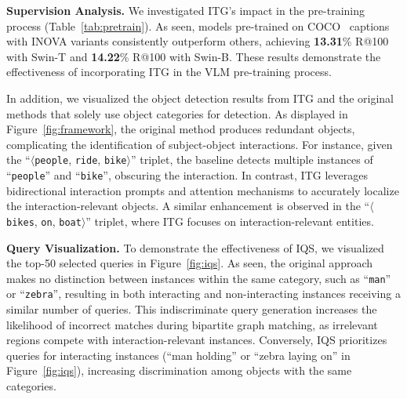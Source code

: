 \textbf{Supervision Analysis.}
We investigated ITG's impact in the pre-training process (\cf Table~\ref{tab:pretrain}). As seen, models pre-trained on COCO~\cite{chen2015microsoft} captions with INOVA variants consistently outperform others, achieving \textbf{13.31}\% R@100 with Swin-T and \textbf{14.22}\% R@100 with Swin-B. These results demonstrate the effectiveness of incorporating ITG in the VLM pre-training process.

In addition, we visualized the object detection results from ITG and the original methods that solely use object categories for detection. As displayed in Figure~\ref{fig:framework}, the original method produces redundant objects, complicating the identification of subject-object interactions. For instance, given the ``$\langle$\texttt{people}, \texttt{ride}, \texttt{bike}$\rangle$'' triplet, the baseline detects multiple instances of ``\texttt{people}'' and ``\texttt{bike}'', obscuring the interaction. In contrast, ITG leverages bidirectional interaction prompts and attention mechanisms to accurately localize the interaction-relevant objects. A similar enhancement is observed in the ``$\langle$\texttt{bikes}, \texttt{on}, \texttt{boat}$\rangle$'' triplet, where ITG focuses on interaction-relevant entities. 

\textbf{Query Visualization.} To demonstrate the effectiveness of IQS, we visualized the top-50 selected queries in Figure~\ref{fig:iqs}. As seen, the original approach makes no distinction between instances within the same category, such as ``\texttt{man}'' or ``\texttt{zebra}'', resulting in both interacting and non-interacting instances receiving a similar number of queries. This indiscriminate query generation increases the likelihood of incorrect matches during bipartite graph matching, as irrelevant regions compete with interaction-relevant instances. Conversely, IQS prioritizes queries for interacting instances (``man holding'' or ``zebra laying on'' in Figure~\ref{fig:iqs}), increasing discrimination among objects with the same categories. 
